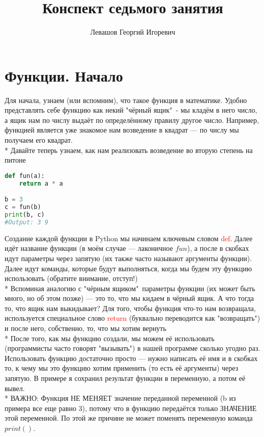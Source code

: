 \documentclass[12pt]{article} %
\begin{document}
\title{Конспект седьмого занятия}
\author{Левашов Георгий Игоревич}
\maketitle{}
\section{Функции. Начало}

Для начала, узнаем (или вспомним), что такое функция в математике. Удобно представлять себе функцию как некий "чёрный ящик"\ - мы кладём в него число, а ящик нам по числу выдаёт по определённому правилу другое число. Например, функцией является уже знакомое нам возведение в квадрат --- по числу мы получаем его квадрат.
\\* Давайте теперь узнаем, как нам реализовать возведение во вторую степень на питоне

\begin{lstlisting}[language=Python]
def fun(a):
    return a * a

b = 3
c = fun(b)
print(b, c)
#Output: 3 9
\end{lstlisting}
Создание каждой функции в Python мы начинаем ключевым словом \textcolor{red}{def}. Далее идёт название функции (в моём случае --- лаконичное $fun$), а после в скобках идут параметры через запятую (их также часто называют аргументы функции). Далее идут команды, которые будут выполняться, когда мы будем эту функцию использовать (обратите внимание, отступ!)
\\* Вспоминая аналогию с "чёрным ящиком"\, параметры функции (их может быть много, но об этом позже) --- это то, что мы кидаем в чёрный ящик. А что тогда то, что ящик нам выкидывает? Для того, чтобы функция что-то нам возвращала, используется специальное слово \textcolor{red}{return} (буквально переводится как "возвращать") и после него, собственно, то, что мы хотим вернуть
\\* После того, как мы функцию создали, мы можем её использовать (программисты часто говорят "вызывать") в нашей программе сколько угодно раз. Использовать функцию достаточно просто --- нужно написать её имя и в скобках то, к чему мы это функцию хотим применить (то есть её аргументы) через запятую. В примере я сохранил результат функции в переменную, а потом её вывел.
\\* ВАЖНО: Функция НЕ МЕНЯЕТ значение переданной переменной (b из примера все еще равно 3), потому что в функцию передаётся только ЗНАЧЕНИЕ этой переменной. По этой же причине не может поменять переменную команда $print()$.
\end{document}
